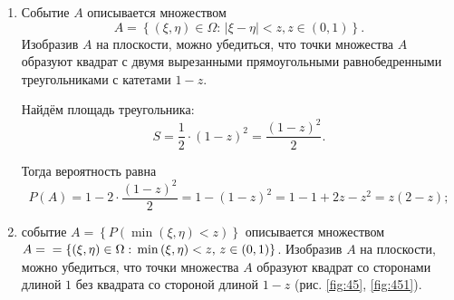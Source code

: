 \begin{enumerate}[label=\alph*)]
\item Событие $A$ описывается множеством
$$A =
\left\{ \left( \xi, \eta \right) \in \Omega: \,
\left| \xi - \eta \right| < z,
z \in \left( 0, 1 \right) \right\}.$$
Изобразив $A$ на плоскости,
можно убедиться,
что точки множества $A$ образуют квадрат с двумя вырезанными прямоугольными равнобедренными треугольниками с катетами $1 - z$.

Найдём площадь треугольника:
$$S = \frac{1}{2} \cdot \left( 1-z \right)^2 =
\frac{ \left( 1-z \right)^2}{2}.$$

Тогда вероятность равна
$$P \left( A \right) =
1 - 2 \cdot \frac{ \left( 1-z \right)^2}{2} =
1 - \left( 1-z \right)^2 =
1 - 1 + 2z - z^2 =
z \left( 2-z \right);$$

\item событие
$A =
\left\{ P \left( \min \left( \xi, \eta \right) < z \right) \right\}$
описывается множеством
$A = \\
= \left\{ \left( \xi, \eta \right) \in \Omega: \,
\min \left( \xi, \eta \right) < z, \,
z \in \left( 0, 1 \right) \right\} $.
Изобразив $A$ на плоскости,
можно убедиться, что точки множества $A$ образуют квадрат со сторонами длиной $1$ без квадрата со стороной длиной $1 - z$ (рис. \ref{fig:45}, \ref{fig:451}).


\end{enumerate}
